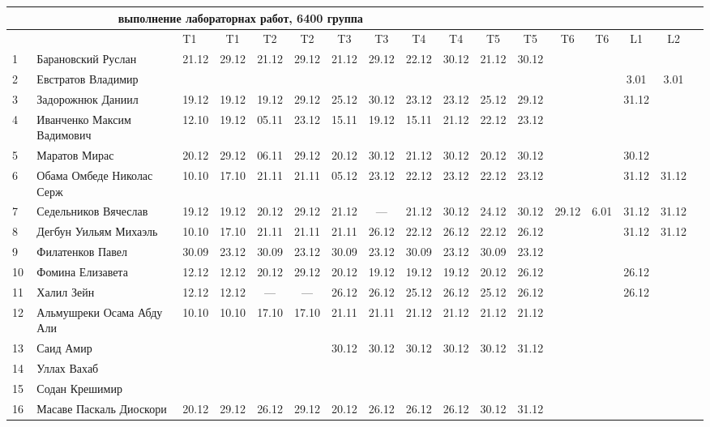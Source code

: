 \documentclass[a4paper,landscape,11pt]{article}
\begin{document}
\newpage
%
\begin{tabular}{l|llccc|cccc|ccccccc}
\multicolumn{10}{c}{выполнение лабораторнах работ, 6400 группа} \\
\toprule
&&T1&T1& T2&T2& T3&T3& T4&T4&T5&T5&T6&T6&L1&L2\\
\midrule
1\,&  Барановский Руслан         &21.12& 29.12& 21.12& 29.12& 21.12& 29.12& 22.12& 30.12& 21.12& 30.12\\
2\,&  Евстратов Владимир         &     &      &      &      &      &      &      &      &      &      &&&3.01&  3.01\\
3\,&  Задорожнюк Даниил          &19.12& 19.12& 19.12& 29.12& 25.12& 30.12& 23.12& 23.12& 25.12& 29.12&&&31.12\\ %
4\,&  Иванченко Максим Вадимович &12.10& 19.12& 05.11& 23.12& 15.11& 19.12& 15.11& 21.12& 22.12& 23.12\\ %
5\,&  Маратов Мирас              &20.12& 29.12& 06.11& 29.12& 20.12& 30.12& 21.12& 30.12& 20.12& 30.12&&&30.12\\ %
\midrule
6\,&  Обама Омбеде Николас Серж  &10.10& 17.10& 21.11& 21.11& 05.12& 23.12& 22.12& 23.12& 22.12& 23.12&&&31.12&31.12\\   %
7\,&  Седельников Вячеслав       &19.12& 19.12& 20.12& 29.12& 21.12&  --- & 21.12& 30.12& 24.12& 30.12& 29.12& 6.01&31.12&31.12 \\   %
8\,&  Дегбун Уильям Михаэль      &10.10& 17.10& 21.11& 21.11& 21.11& 26.12& 22.12& 26.12& 22.12& 26.12&&&31.12&31.12\\   %
9\,&  Филатенков Павел           &30.09 &23.12& 30.09& 23.12& 30.09& 23.12& 30.09& 23.12& 30.09& 23.12\\
10\,& Фомина Елизавета           &12.12& 12.12& 20.12& 29.12& 20.12& 19.12& 19.12& 19.12& 20.12& 26.12&&& 26.12 \\  %
\midrule
11\,& Халил Зейн                 &12.12& 12.12&  --- &  --- & 26.12& 26.12& 25.12& 26.12& 25.12& 26.12&&& 26.12\\ %
12\,& Альмушреки Осама Абду Али  &10.10& 10.10& 17.10& 17.10& 21.11& 21.11& 21.12& 21.12& 21.12& 21.12\\   %
13\,& Саид Амир                  &     &      &      &      & 30.12& 30.12& 30.12& 30.12& 30.12& 31.12\\ %
14\,& Уллах Вахаб                &&&&&&&&\\
15\,& Содан Крешимир             &&&&&&&&\\
16\,& Масаве Паскаль Диоскори    &20.12& 29.12& 26.12& 29.12& 20.12& 26.12& 26.12& 26.12& 30.12& 31.12    \\ %
\bottomrule
\end{tabular}
\end{document}
